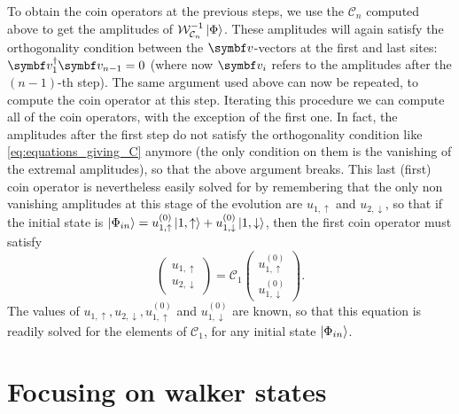 To obtain the coin operators at the previous steps, we use the $\mathcal C_n$ computed above to get the amplitudes of $\mathcal W_{\mathcal C_n}^{-1} \ket\Phi$.
These amplitudes will again satisfy the orthogonality condition between the $\bs v$-vectors at the first and last sites:
${\bs v_1^\dagger \bs v_{n-1} = 0}$
(where now $\bs v_i$ refers to the amplitudes after the $(n-1)$-th step).
The same argument used above can now be repeated, to compute the coin operator at this step.
Iterating this procedure we can compute all of the coin operators, with the exception of the first one.
In fact, the amplitudes after the first step do not satisfy the orthogonality condition like \cref{eq:equations_giving_C} anymore (the only condition on them is the vanishing of the extremal amplitudes), so that the above argument breaks.
This last (first) coin operator is nevertheless easily solved for by remembering that the only non vanishing amplitudes at this stage of the evolution are $u_{1,\uparrow}$ and $u_{2, \downarrow}$, so that if the initial state is
${\ket{\Phi_{in}} = u^{(0)}_{1,\uparrow} \ket{1, \uparrow} + u^{(0)}_{1, \downarrow} \ket{1, \downarrow}}$, then the first coin operator must satisfy
\begin{equation}
	\begin{pmatrix}
		u_{1, \uparrow} \\ u_{2,\downarrow}
	\end{pmatrix}
	= \mathcal C_1
	\begin{pmatrix}
		u^{(0)}_{1, \uparrow} \\ u^{(0)}_{1, \downarrow}
	\end{pmatrix}.
\end{equation}
The values of $u_{1, \uparrow}, u_{2,\downarrow}, u^{(0)}_{1, \uparrow}$ and $u^{(0)}_{1, \downarrow}$ are known, so that this equation is readily solved for the elements of $\mathcal C_1$, for any initial state $\ket{\Phi_{in}}$.

\section{Focusing on walker states}
\label{sec:qw_focusing_walker_states}

